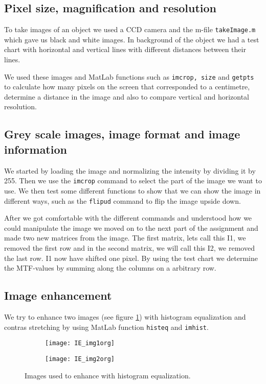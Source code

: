 \subsection{Pixel size, magnification and resolution}
To take images of an object we used a CCD camera and the m-file \texttt{takeImage.m} which gave us black and white images. In background of the object we had a test chart with horizontal and vertical lines with different distances between their lines. 

We used these images and MatLab functions such as \texttt{imcrop, size} and \texttt{getpts} to calculate how many pixels on the screen that corresponded to a centimetre, determine a distance in the image and also to compare vertical and horizontal resolution. 

\subsection{Grey scale images, image format and image information}
We started by loading the image and normalizing the intensity by dividing it by 255. Then we use the \texttt{imcrop} command to select the part of the image we want to use. We then test some different functions to show that we can show the image in different ways, such as the \texttt{flipud} command to flip the image upside down. 

After we got comfortable with the different commands and understood how we could manipulate the image we moved on to the next part of the assignment and made two new matrices from the image. The first matrix, lets call this I1, we removed the first row and in the second matrix, we will call this I2, we removed the last row. I1 now have shifted one pixel.
By using the test chart we determine the MTF-values by summing along the columns on a arbitrary row.

\subsection{Image enhancement}
We try to enhance two images (see figure \ref{fig:histeqBefore}) with histogram equalization and contras stretching by using MatLab function \texttt{histeq} and \texttt{imhist}. 

\begin{figure}
	\centering
	\begin{subfigure}[b]{0.4\textwidth}
		\texttt{[image: IE\_img1org]}
	\end{subfigure}
	\begin{subfigure}[b]{0.4\textwidth}
		\texttt{[image: IE\_img2org]}
	\end{subfigure}
	\caption{Images used to enhance with histogram equalization.}
	\label{fig:histeqBefore}
\end{figure}

